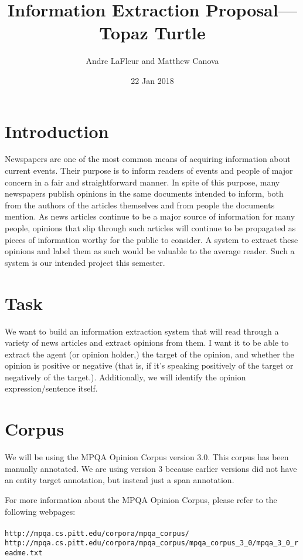 \documentclass{article}
\title{Information Extraction Proposal---Topaz Turtle}
\author{Andre LaFleur and Matthew Canova}
\date{22 Jan 2018}
\begin{document}
	\maketitle

    \section{Introduction}

    Newspapers are one of the most common means of acquiring information about current events. Their purpose is to inform readers of events and people of major concern in a fair and straightforward manner. In spite of this purpose, many newspapers publish opinions in the same documents intended to inform, both from the authors of the articles themselves and from people the documents mention. As news articles continue to be a major source of information for many people, opinions that slip through such articles will continue to be propagated as pieces of information worthy for the public to consider. A system to extract these opinions and label them as such would be valuable to the average reader. Such a system is our intended project this semester.

    \section{Task}

    We want to build an information extraction system that will read through a variety of news articles and extract opinions from them. I want it to be able to extract the agent (or opinion holder,) the target of the opinion, and whether the opinion is positive or negative (that is, if it's speaking positively of the target or negatively of the target.). Additionally, we will identify the opinion expression/sentence itself. 

    \section{Corpus}

    We will be using the MPQA Opinion Corpus version 3.0. This corpus has been manually annotated. We are using version 3 because earlier versions did not have an entity target annotation, but instead just a span annotation.

    For more information about the MPQA Opinion Corpus, please refer to the following webpages:\\ \\
    \verb|http://mpqa.cs.pitt.edu/corpora/mpqa_corpus/|\\
    \verb|http://mpqa.cs.pitt.edu/corpora/mpqa_corpus/mpqa_corpus_3_0/mpqa_3_0_readme.txt|
\end{document}
